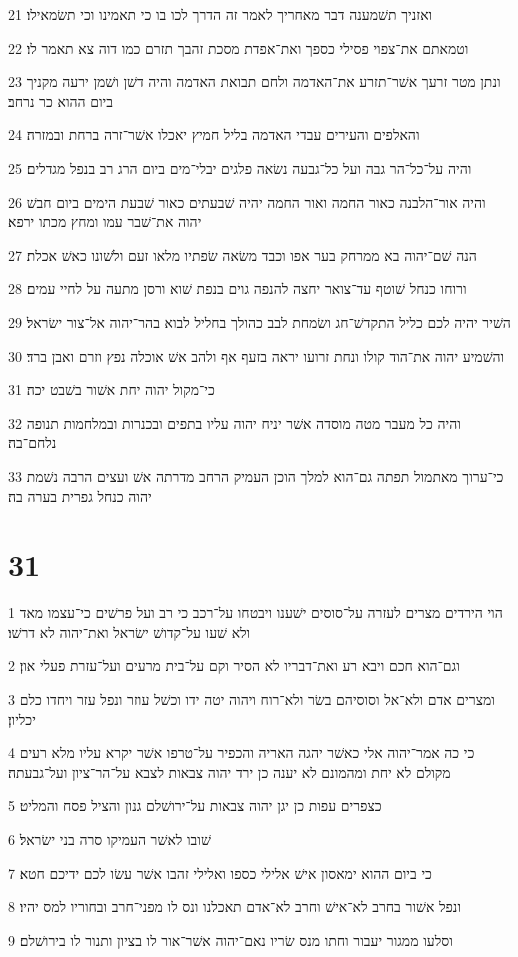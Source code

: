 \par 21 ואזניך תשׁמענה דבר מאחריך לאמר זה הדרך לכו בו כי תאמינו וכי תשׂמאילו׃
\par 22 וטמאתם את־צפוי פסילי כספך ואת־אפדת מסכת זהבך תזרם כמו דוה צא תאמר לו׃
\par 23 ונתן מטר זרעך אשׁר־תזרע את־האדמה ולחם תבואת האדמה והיה דשׁן ושׁמן ירעה מקניך ביום ההוא כר נרחב׃
\par 24 והאלפים והעירים עבדי האדמה בליל חמיץ יאכלו אשׁר־זרה ברחת ובמזרה׃
\par 25 והיה על־כל־הר גבה ועל כל־גבעה נשׂאה פלגים יבלי־מים ביום הרג רב בנפל מגדלים׃
\par 26 והיה אור־הלבנה כאור החמה ואור החמה יהיה שׁבעתים כאור שׁבעת הימים ביום חבשׁ יהוה את־שׁבר עמו ומחץ מכתו ירפא׃
\par 27 הנה שׁם־יהוה בא ממרחק בער אפו וכבד משׂאה שׂפתיו מלאו זעם ולשׁונו כאשׁ אכלת׃
\par 28 ורוחו כנחל שׁוטף עד־צואר יחצה להנפה גוים בנפת שׁוא ורסן מתעה על לחיי עמים׃
\par 29 השׁיר יהיה לכם כליל התקדשׁ־חג ושׂמחת לבב כהולך בחליל לבוא בהר־יהוה אל־צור ישׂראל׃
\par 30 והשׁמיע יהוה את־הוד קולו ונחת זרועו יראה בזעף אף ולהב אשׁ אוכלה נפץ וזרם ואבן ברד׃
\par 31 כי־מקול יהוה יחת אשׁור בשׁבט יכה׃
\par 32 והיה כל מעבר מטה מוסדה אשׁר יניח יהוה עליו בתפים ובכנרות ובמלחמות תנופה נלחם־בה׃
\par 33 כי־ערוך מאתמול תפתה גם־הוא למלך הוכן העמיק הרחב מדרתה אשׁ ועצים הרבה נשׁמת יהוה כנחל גפרית בערה בה׃

\chapter{31}

\par 1 הוי הירדים מצרים לעזרה על־סוסים ישׁענו ויבטחו על־רכב כי רב ועל פרשׁים כי־עצמו מאד ולא שׁעו על־קדושׁ ישׂראל ואת־יהוה לא דרשׁו׃
\par 2 וגם־הוא חכם ויבא רע ואת־דבריו לא הסיר וקם על־בית מרעים ועל־עזרת פעלי און׃
\par 3 ומצרים אדם ולא־אל וסוסיהם בשׂר ולא־רוח ויהוה יטה ידו וכשׁל עוזר ונפל עזר ויחדו כלם יכליון׃
\par 4 כי כה אמר־יהוה אלי כאשׁר יהגה האריה והכפיר על־טרפו אשׁר יקרא עליו מלא רעים מקולם לא יחת ומהמונם לא יענה כן ירד יהוה צבאות לצבא על־הר־ציון ועל־גבעתה׃
\par 5 כצפרים עפות כן יגן יהוה צבאות על־ירושׁלם גנון והציל פסח והמליט׃
\par 6 שׁובו לאשׁר העמיקו סרה בני ישׂראל׃
\par 7 כי ביום ההוא ימאסון אישׁ אלילי כספו ואלילי זהבו אשׁר עשׂו לכם ידיכם חטא׃
\par 8 ונפל אשׁור בחרב לא־אישׁ וחרב לא־אדם תאכלנו ונס לו מפני־חרב ובחוריו למס יהיו׃
\par 9 וסלעו ממגור יעבור וחתו מנס שׂריו נאם־יהוה אשׁר־אור לו בציון ותנור לו בירושׁלם׃


